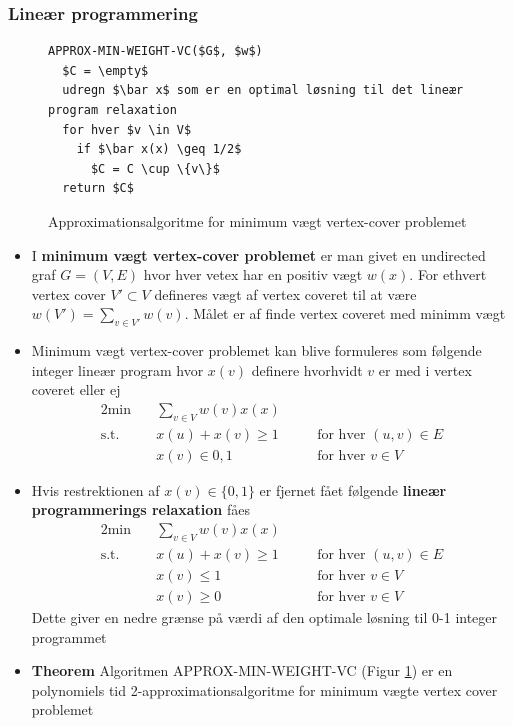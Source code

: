 \subsubsection{Lineær programmering}
\begin{figure}[ht]
  \centering
\begin{lstlisting}
APPROX-MIN-WEIGHT-VC($G$, $w$)
  $C = \empty$ 
  udregn $\bar x$ som er en optimal løsning til det lineær program relaxation
  for hver $v \in V$ 
    if $\bar x(x) \geq 1/2$
      $C = C \cup \{v\}$
  return $C$
\end{lstlisting}
  \caption{Approximationsalgoritme for minimum vægt vertex-cover problemet\label{fig:vertex-min-weight}}
\end{figure}

\begin{itemize}
	\item I \textbf{minimum vægt vertex-cover problemet} er man givet en undirected graf $G=(V,E)$ hvor hver vetex har en positiv vægt $w(x)$. For ethvert vertex cover $V' \subset V$ defineres vægt af vertex coveret til at være $w(V') = \sum_{v \in V'} w(v)$. Målet er af finde vertex coveret med minimm vægt
  \item Minimum vægt vertex-cover problemet kan blive formuleres som følgende integer lineær program hvor $x(v)$ definere hvorhvidt $v$ er med i vertex coveret eller ej
  \begin{alignat*}{2}
    \text{min} \quad  & \sum_{v \in V} w(v) x(x) && \\
    \text{s.t.} \quad & x(u) + x(v) \geq 1 && \quad \text{for hver } (u,v) \in E \\
    & x(v) \in {0,1} && \quad \text{for hver } v \in V
  \end{alignat*}
  \item Hvis restrektionen af $x(v) \in \{0,1\}$ er fjernet fået følgende \textbf{lineær programmerings relaxation} fåes
  \begin{alignat*}{2}
    \text{min} \quad  & \sum_{v \in V} w(v) x(x) && \\
    \text{s.t.} \quad & x(u) + x(v) \geq 1 && \quad \text{for hver } (u,v) \in E \\
    & x(v) \leq 1 && \quad \text{for hver } v \in V \\
    & x(v) \geq 0 && \quad \text{for hver } v \in V
  \end{alignat*}
  Dette giver en nedre grænse på værdi af den optimale løsning til 0-1 integer programmet
  \item \textbf{Theorem} Algoritmen APPROX-MIN-WEIGHT-VC (Figur \ref{fig:vertex-min-weight}) er en polynomiels tid 2-approximationsalgoritme for minimum vægte vertex cover problemet
\end{itemize}

